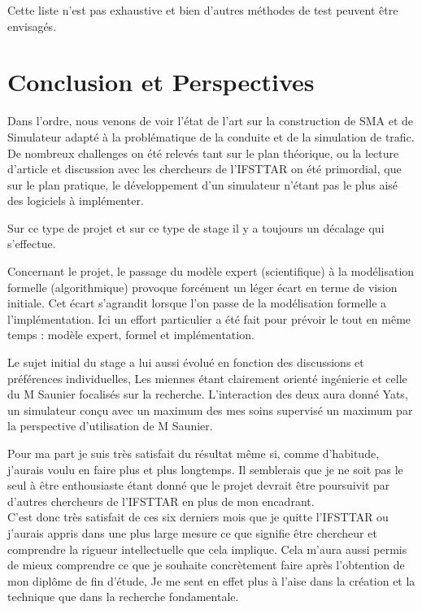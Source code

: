 \documentclass[a4paper,11pt]{article}
\begin{document}
Cette liste n'est pas exhaustive et bien d'autres méthodes de test peuvent être envisagés. 

\newpage
\section{Conclusion et Perspectives}

Dans l'ordre, nous venons de voir l'état de l'art sur la construction de SMA et de Simulateur adapté à la problématique de la conduite et de la simulation de trafic. De nombreux challenges on été relevés tant sur le plan théorique, ou la lecture d'article et discussion avec les chercheurs de l'IFSTTAR on été primordial, que sur le plan pratique, le développement d'un simulateur n'étant pas le plus aisé des logiciels à implémenter. 

Sur ce type de projet et sur ce type de stage il y a toujours un décalage qui s'effectue. 

Concernant le projet, le passage du modèle expert (scientifique) à la modélisation formelle (algorithmique) provoque forcément un léger écart en terme de vision initiale. Cet écart s'agrandit lorsque l'on passe de la modélisation formelle a l'implémentation. Ici un effort particulier a été fait pour prévoir le tout en même temps : modèle expert, formel et implémentation.

Le sujet initial du stage a lui aussi évolué en fonction des discussions et préférences individuelles, Les miennes étant clairement orienté ingénierie et celle du M Saunier focalisés sur la recherche. L'interaction des deux aura donné Yats, un simulateur conçu avec un maximum des mes soins supervisé un maximum par la perspective d'utilisation de M Saunier. 

Pour ma part je suis très satisfait du résultat même si, comme d'habitude, j'aurais voulu en faire plus et plus longtemps. Il semblerais que je ne soit pas le seul à être enthousiaste étant donné que le projet devrait être poursuivit par d'autres chercheurs de l'IFSTTAR en plus de mon encadrant. \\

C'est donc très satisfait de ces six derniers mois que je quitte l'IFSTTAR ou j'aurais appris dans une plus large mesure ce que signifie être chercheur et comprendre la rigueur intellectuelle que cela implique. Cela m'aura aussi permis de mieux comprendre ce que je souhaite concrètement faire après l'obtention de mon diplôme de fin d'étude, Je me sent en effet plus à l'aise dans la création et la technique que dans la recherche fondamentale.
\end{document}
